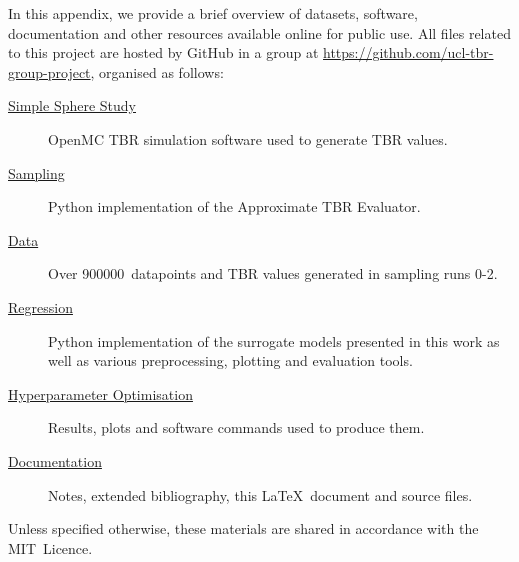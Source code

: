 In this appendix, we provide a brief overview of datasets, software, documentation 
and other resources available online for public use. All files related to this
project are hosted by GitHub in a group at
\url{https://github.com/ucl-tbr-group-project}, organised as follows:
\begin{description}
	\item[\href{https://github.com/ucl-tbr-group-project/simple-sphere-study}{Simple Sphere Study}]
		OpenMC TBR simulation software used to generate TBR values.
	\item[\href{https://github.com/ucl-tbr-group-project/sampling}{Sampling}]
		Python implementation of the Approximate TBR Evaluator.
	\item[\href{https://github.com/ucl-tbr-group-project/data}{Data}]
		Over \num{900000}~datapoints and TBR values generated in sampling runs 0-2.
	\item[\href{https://github.com/ucl-tbr-group-project/regression}{Regression}]
		Python implementation of the surrogate models presented in this work as
		well as various preprocessing, plotting and evaluation tools.
	\item[\href{https://github.com/ucl-tbr-group-project/hyperopt}{Hyperparameter Optimisation}]
		Results, plots and software commands used to produce them.
	\item[\href{https://github.com/ucl-tbr-group-project/documentation}{Documentation}]
		Notes, extended bibliography, this \LaTeX\  document and source files.
\end{description}

Unless specified otherwise, these materials are shared in accordance with the MIT~Licence.

